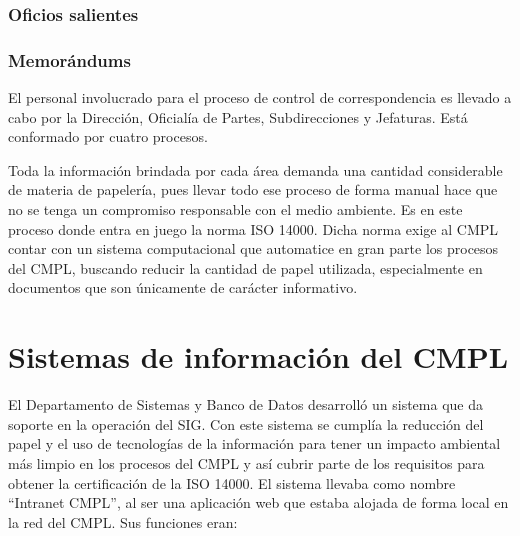 	\subsubsection{Oficios salientes}
	
	\subsubsection{Memorándums}
	
	
	
	
	
	
	El personal involucrado para el proceso de control de correspondencia es llevado a cabo por la  Dirección, Oficialía de Partes, Subdirecciones y Jefaturas. Está conformado por cuatro procesos.
	
	Toda la información brindada por cada área demanda una cantidad considerable de materia de papelería, pues llevar todo ese proceso de forma manual hace que no se tenga un compromiso responsable con el medio ambiente.  Es en este proceso donde entra en juego la norma ISO 14000. Dicha norma exige al CMPL contar con un sistema computacional que automatice en gran parte los procesos del CMPL, buscando reducir la cantidad de papel utilizada, especialmente en documentos que son únicamente de carácter informativo.\\
	
	\section{Sistemas de información del CMPL}
	El Departamento de Sistemas y Banco de Datos desarrolló un sistema que da soporte en la operación del SIG. Con este sistema se cumplía la reducción del papel y el uso de tecnologías de la información para tener un impacto ambiental más limpio en los procesos del CMPL  y así cubrir parte de los requisitos para obtener la certificación de la ISO 14000. El sistema llevaba como nombre ``Intranet CMPL'', al ser una aplicación web que estaba alojada de forma local en la red del CMPL. Sus funciones eran:\\
	
